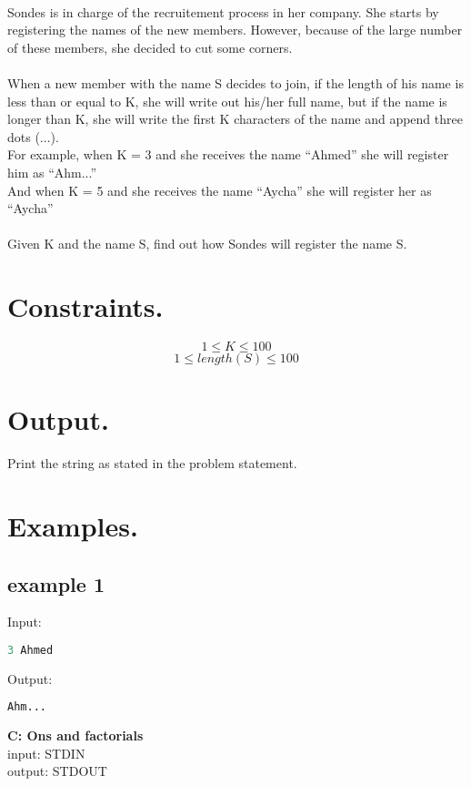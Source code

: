 \documentclass[10pt]{article}
\begin{document}
\paragraph{}
Sondes is in charge of the recruitement process in her company. She starts by registering the names of the new members.
However, because of the large number of these members, she decided to cut some corners.
\paragraph{}
When a new member with the name S decides to join, if the length of his name is less than or equal to K, she will write out his/her full name, but if the name is longer than K, she will write the first K characters of the name and append three dots (...).\\
For example, when K = 3 and she receives the name “Ahmed” she will register him as “Ahm...”\\
And when K = 5 and she receives the name “Aycha” she will register her as “Aycha”\\
\paragraph{}
Given K and the name S, find out how Sondes will register the name S.
\paragraph{}
\section{Constraints.}
$$ 1\le K \le 100 $$
$$ 1\le length(S) \le 100 $$
\section{Output.}
Print the string as stated in the problem statement.
\section{Examples.}
\subsection{example 1}
Input:
\begin{lstlisting}[language=Python]
3 Ahmed
\end{lstlisting}
Output:
\begin{lstlisting}[language=Python]
Ahm...
\end{lstlisting}
\newpage
\begin{center}
    \Huge { \textbf{C: Ons and factorials}}\\
    \normalsize  { input:  STDIN}\\
    \normalsize{    output: STDOUT}
\end{center}
\end{document}
